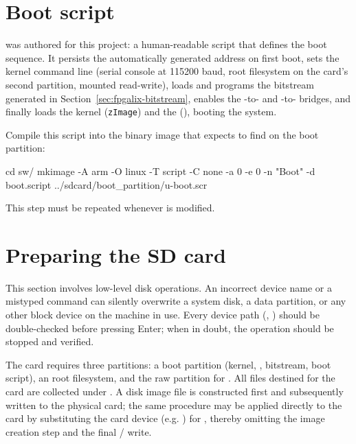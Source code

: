 \section{Boot script}
\label{sec:fpgalix-boot-script}

 was authored for this project: a human-readable  script that defines the boot sequence. It persists the automatically generated  address on first boot, sets the kernel command line (serial console at 115200 baud, root filesystem on the  card's second partition, mounted read-write), loads and programs the  bitstream generated in Section~\ref{sec:fpgalix-bitstream}, enables the -to- and -to- bridges, and finally loads the  kernel (\texttt{zImage}) and the  (), booting the system.

Compile this script into the binary image that  expects to find on the boot partition:

\begin{shellcodehost}
cd sw/
mkimage -A arm -O linux -T script -C none -a 0 -e 0 -n "Boot" -d boot.script ../sdcard/boot_partition/u-boot.scr
\end{shellcodehost}

This step must be repeated whenever  is modified.

\section{Preparing the SD card}

\begin{warningbox}
    This section involves low-level disk operations. An incorrect device name or a mistyped command can silently overwrite a system disk, a data partition, or any other block device on the machine in use. Every device path (, ) should be double-checked before pressing Enter; when in doubt, the operation should be stopped and verified.
\end{warningbox}

The  card requires three partitions: a  boot partition (kernel, , bitstream, boot script), an  root filesystem, and the raw  partition for . All files destined for the card are collected under . A disk image file is constructed first and subsequently written to the physical  card; the same procedure may be applied directly to the  card by substituting the  card device (e.g. ) for , thereby omitting the image creation step and the final / write.


